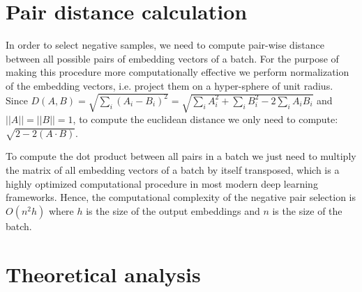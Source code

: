 \documentclass[sigconf, anonymous]{acmart}
\begin{document}
\fi





\iffalse

\clearpage

\appendix

\section{Pair distance calculation} \label{app-sec-pair-dist}

In order to select negative samples, we need to compute pair-wise distance between all possible pairs of embedding vectors of a batch. For the purpose of making this procedure more computationally effective we perform normalization of the embedding vectors, i.e. project them on a hyper-sphere of unit radius. Since $D(A,B) = \sqrt{\sum_i(A_i - B_i)^2} = \sqrt{\sum_i A_i^2 + \sum_i B_i^2 - 2\sum_i A_i B_i} $ and $||A||= ||B||=1$, to compute the euclidean distance we only need to compute: $\sqrt{2 - 2(A \cdot B)}$.

To compute the dot product between all pairs in a batch we just need to multiply the matrix of all embedding vectors of a batch by itself transposed, which is a highly optimized computational procedure in most modern deep learning frameworks. Hence, the computational complexity of the negative pair selection is $O(n^2h)$ where $h$ is the size of the output embeddings and $n$ is the size of the batch.

\iffalse

\section{Theoretical analysis} \label{sec-theory}
\end{document}
